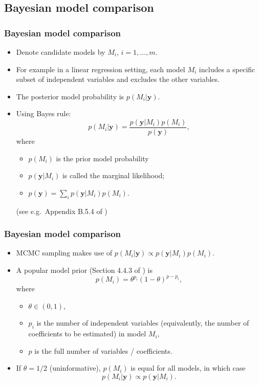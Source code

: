 \documentclass[xcolor=table,10pt]{beamer}
\begin{document}
\subsection{Bayesian model comparison}

\begin{frame}
  \frametitle{Bayesian model comparison}
  \begin{itemize}
  \item Denote candidate models by $M_i$, $i=1,\ldots, m$.
  \item For example in a linear regression setting, each model $M_i$
    includes a specific subset of independent variables and excludes
    the other variables.
  \item The \alert{posterior model probability} is $p(M_i|\bm y)$.
  \item Using Bayes rule:
    \begin{equation}
      \label{eq:2}
      p(M_i|\bm y) = \frac{p(\bm y|M_i) p(M_i)} {p(\bm y)},
    \end{equation}
    where
    \begin{itemize}
      \addtolength{\itemsep}{3pt}
    \item $p(M_i)$ is the \alert{prior model probability}
    \item $p(\bm y|M_i)$ is called the \alert{marginal likelihood};
    \item $p(\bm y) = \sum_i p(\bm y|M_i) p(M_i)$. 
    \end{itemize}
    (see e.g.\ Appendix B.5.4 of \citep{Fahrmeir2013})
  \end{itemize}
\end{frame}

\begin{frame}
  \frametitle{Bayesian model comparison}
  \begin{itemize}
  \item MCMC sampling makes use of
    $p(M_i|\bm y)\propto p(\bm y|M_i) p(M_i)$.
  \item A popular model prior (Section 4.4.3 of \citep{Fahrmeir2013})
    is
    \begin{equation}
      \label{eq:7}
      p(M_i) = \theta^{p_i} (1-\theta)^{p-p_i},
    \end{equation}
    where
    \begin{itemize}
      \addtolength{\itemsep}{2pt}
    \item $\theta\in (0,1)$,
    \item $p_i$ is the number of independent variables (equivalently,
      the number of coefficients to be estimated) in model $M_i$,
    \item $p$ is the full number of variables / coefficients.
    \end{itemize}
  \item If $\theta=1/2$ (uninformative), $p(M_i)$ is equal for all
    models, in which case
    \begin{equation*}
      p(M_i|\bm y)\propto p(\bm y|M_i).
    \end{equation*}
  \end{itemize}
\end{frame}
\end{document}
